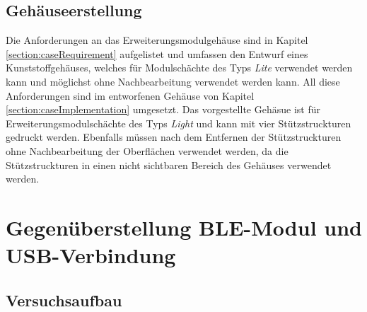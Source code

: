 \subsection{Gehäuseerstellung}
Die Anforderungen an das Erweiterungsmodulgehäuse sind in Kapitel \ref{section:caseRequirement} aufgelistet und umfassen den Entwurf eines Kunststoffgehäuses, welches für Modulschächte des Typs \textit{Lite} verwendet werden kann und möglichst ohne Nachbearbeitung verwendet werden kann. All diese Anforderungen sind im entworfenen Gehäuse von Kapitel \ref{section:caseImplementation} umgesetzt. Das vorgestellte Gehäsue ist für Erweiterungsmodulschächte des Typs \textit{Light} und kann mit vier Stützstruckturen gedruckt werden. Ebenfalls müssen nach dem Entfernen der Stützstruckturen ohne Nachbearbeitung der Oberflächen verwendet werden, da die Stützstruckturen in einen nicht sichtbaren Bereich des Gehäuses verwendet werden.

\section{Gegenüberstellung \acs{BLE}-Modul und USB-Verbindung}

\subsection{Versuchsaufbau}


